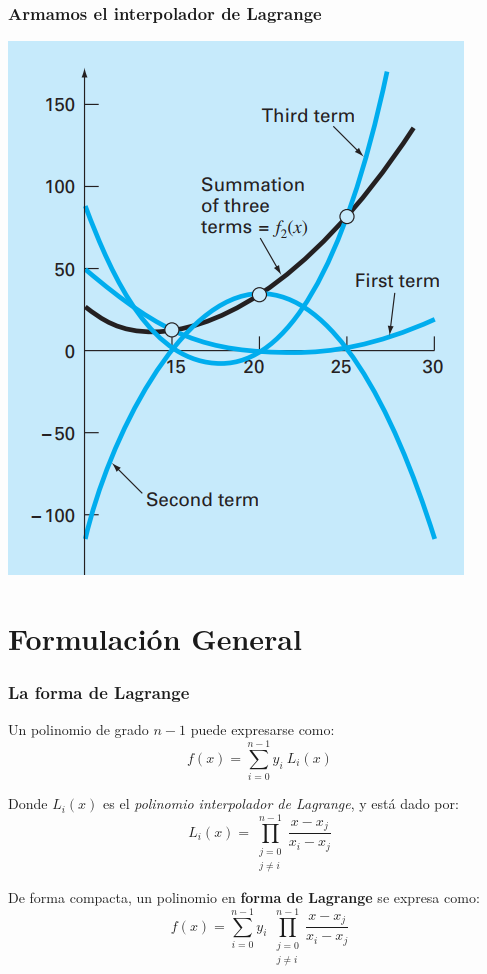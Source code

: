 \documentclass[11pt,xcolor={rgb}]{beamer}
\begin{document}
\begin{frame}[fragile=singleslide]
\frametitle{Armamos el interpolador de Lagrange}

\begin{center}
	\includegraphics[scale=0.5]{lagrange_3puntos}
\end{center}

\end{frame}


\section{Formulaci\'on General}

\begin{frame}[fragile=singleslide]
\frametitle{La forma de Lagrange}

Un polinomio de grado $n-1$ puede expresarse como:
$$f(x) = \sum\limits_{i=0}^{n-1}y_i\ L_i(x)$$ 

Donde $L_i(x)$ es el \textit{polinomio interpolador de Lagrange}, y est\'a dado por:
$$L_i(x) = \prod_{\substack{j=0 \\ j\neq i}}^{n-1} \frac{x-x_j}{x_i-x_j}$$

De forma compacta, un polinomio en \textbf{forma de Lagrange} se expresa como:
$$f(x) = \sum\limits_{i=0}^{n-1}y_i\ \prod_{\substack{j=0 \\ j\neq i}}^{n-1} \frac{x-x_j}{x_i-x_j}$$ 

\end{frame}
\end{document}
